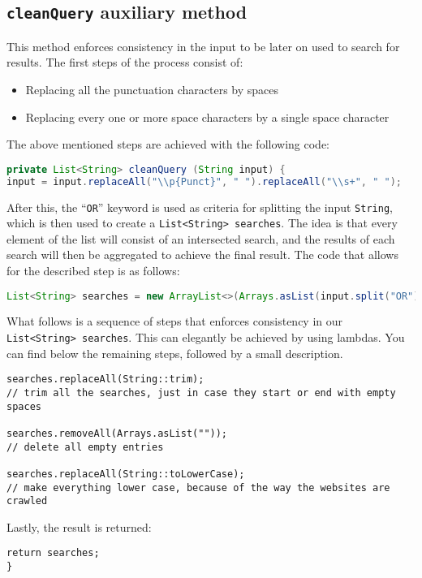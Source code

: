 \subsection{{\tt cleanQuery} auxiliary method}
This method enforces consistency in the input to be later on used to search for results.
The first steps of the process consist of:
\begin{itemize}
\item Replacing all the punctuation characters by spaces
\item Replacing every one or more space characters by a single space character
\end{itemize}
The above mentioned steps are achieved with the following code:
\begin{lstlisting}[language=Java]
private List<String> cleanQuery (String input) {
input = input.replaceAll("\\p{Punct}", " ").replaceAll("\\s+", " ");
\end{lstlisting}
After this, the ``{\tt OR}'' keyword is used as criteria for splitting the input {\tt String}, which is then used to create a {\tt List<String> searches}. The idea is that every element of the list will consist of an intersected search, and the results of each search will then be aggregated to achieve the final result. The code that allows for the described step is as follows:
\begin{lstlisting}[language=Java]
List<String> searches = new ArrayList<>(Arrays.asList(input.split("OR")));
\end{lstlisting}
What follows is a sequence of steps that enforces consistency in our {\tt List<String> searches}. This can elegantly be achieved by using lambdas. You can find below the remaining steps, followed by a small description.
\begin{lstlisting}
searches.replaceAll(String::trim);
// trim all the searches, just in case they start or end with empty spaces

searches.removeAll(Arrays.asList(""));
// delete all empty entries

searches.replaceAll(String::toLowerCase);
// make everything lower case, because of the way the websites are crawled
\end{lstlisting}
Lastly, the result is returned:
\begin{lstlisting}
return searches;
}
\end{lstlisting}
